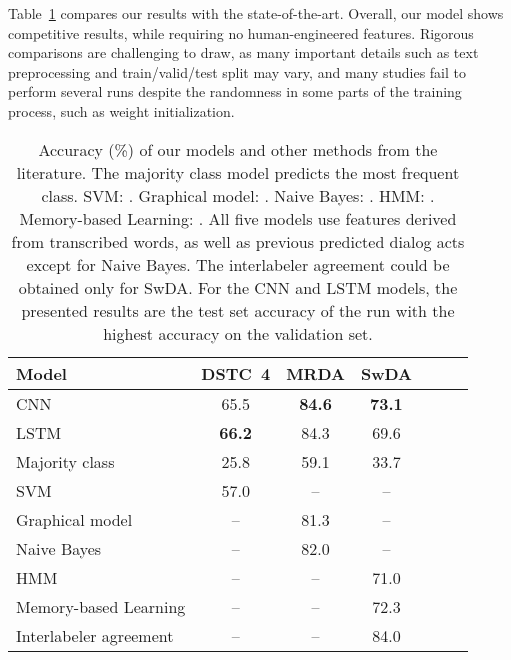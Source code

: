 \documentclass[11pt,letterpaper]{article}
\begin{document}
				
Table~\ref{tab:result-comparisons} compares our results with the state-of-the-art. 
Overall, our model shows competitive results, while requiring no human-engineered features.
Rigorous comparisons are challenging to draw, as many important details such as text preprocessing and train/valid/test split may vary, and many studies fail to perform several runs despite the randomness in some parts of the training process, such as weight initialization.









\vspace{-0.1cm}
\begin{table} [H]
\footnotesize
\centering
\setlength{\extrarowheight}{3pt}
\setlength{\arraycolsep}{5pt}
\begin{tabular}{|l|c|c|c|c|c|c|}
\hline
\textbf{Model} & DSTC~4 	& MRDA 	& SwDA\\
\hline
CNN			& 65.5			&	\textbf{84.6}	& \textbf{73.1} \\ 
LSTM		& \textbf{66.2}			&	84.3	& 69.6 \\ 
Majority class		& 25.8			&	59.1	& 33.7 \\
SVM		& 57.0		&	 --		& --	\\
Graphical model	& --		&	 81.3		& --	\\
Naive Bayes & --			&	 82.0		& --	\\
HMM & --			&	 --		& 71.0	\\
Memory-based Learning & --			&	 --		& 72.3	\\
Interlabeler agreement & --			&	 --		& 84.0	\\
\hline
\end{tabular}
\caption{Accuracy (\%) of our models and other methods from the literature. 
The majority class model predicts the most frequent class. 
SVM: \protect\cite{dernoncourt2016adobe}.
Graphical model: \protect\cite{ji2006backoff}.
Naive Bayes: \protect\cite{lendvai2007token}.
HMM: \protect\cite{stolcke2000dialogue}.
Memory-based Learning: \protect\cite{rotaru2002dialog}. 
All five models use features derived from transcribed words, as well as previous predicted dialog acts except for Naive Bayes.
The interlabeler agreement could be obtained only for SwDA.
For the CNN and LSTM models, the presented results are the test set accuracy of the run with the highest accuracy on the validation set.\vspace{-0.1cm}
} \label{tab:result-comparisons}
\end{table}
\end{document}
